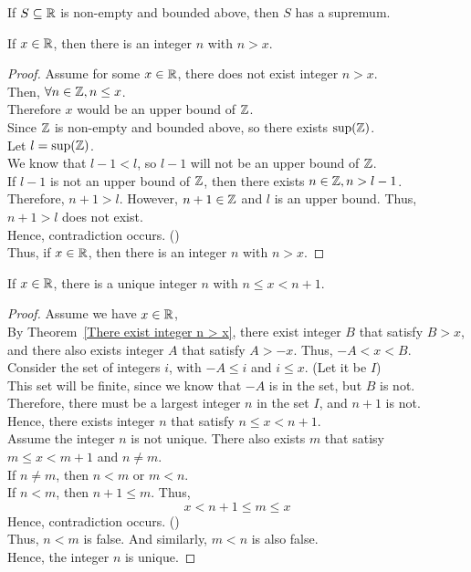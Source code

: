 \documentclass[a4paper]{article}
\begin{document}
\begin{axiom}
If $S \subseteq \mathbb{R}$ is non-empty and bounded above, then $S$ has a supremum.
\end{axiom}

\begin{nthm}\label{There exist integer n > x}
If $x \in \mathbb{R}$, then there is an integer $n$ with $n > x$.
\end{nthm}
\begin{proof}
Assume for some $x \in \mathbb{R}$, there does not exist integer $n > x$.\\
Then, $\forall n \in \mathbb{Z}, n \leq x$.\\
Therefore $x$ would be an upper bound of $\mathbb{Z}$.\\
Since $\mathbb{Z}$ is non-empty and bounded above, so there exists $\sup(\mathbb{Z})$.\\
Let $l = \sup(\mathbb{Z})$.\\
We know that $l - 1 < l$, so $l-1$ will not be an upper bound of $\mathbb{Z}$.\\
If $l-1$ is not an upper bound of $\mathbb{Z}$, then there exists $n \in \mathbb{Z}, n > l-1$.\\
Therefore, $n+1 > l$. However, $n+1 \in \mathbb{Z}$ and $l$ is an upper bound. Thus, $n+1 > l$ does not exist.\\
Hence, contradiction occurs. (\contradiction)\\
Thus, if $x \in \mathbb{R}$, then there is an integer $n$ with $n > x$.
\end{proof}

\begin{nthm}
If $x \in \mathbb{R}$, there is a unique integer $n$ with $n \leq x < n+1$.
\end{nthm}
\begin{proof}
Assume we have $x \in \mathbb{R}$,\\
By Theorem~\ref{There exist integer n > x}, there exist integer $B$ that satisfy $B > x$, and there also exists integer $A$ that satisfy $A > -x$. Thus, $-A < x < B$.\\
Consider the set of integers $i$, with $-A \leq i$ and $i \leq x$. (Let it be $I$)\\
This set will be finite, since we know that $-A$ is in the set, but $B$ is not.\\
Therefore, there must be a largest integer $n$ in the set $I$, and $n+1$ is not.\\
Hence, there exists integer $n$ that satisfy $n \leq x < n+1$.
\vspace{0.2cm}\\
Assume the integer $n$ is not unique. There also exists $m$ that satisy $m \leq x < m+1$ and $n \neq m$.\\
If $n \neq m$, then $n < m$ or $m < n$.\\
If $n < m$, then $n+1 \leq m$. Thus, $$x < n+1 \leq m \leq x$$
Hence, contradiction occurs. (\contradiction)\\
Thus, $n < m$ is false. And similarly, $m < n$ is also false.\\
Hence, the integer $n$ is unique.
\end{proof}
\end{document}
